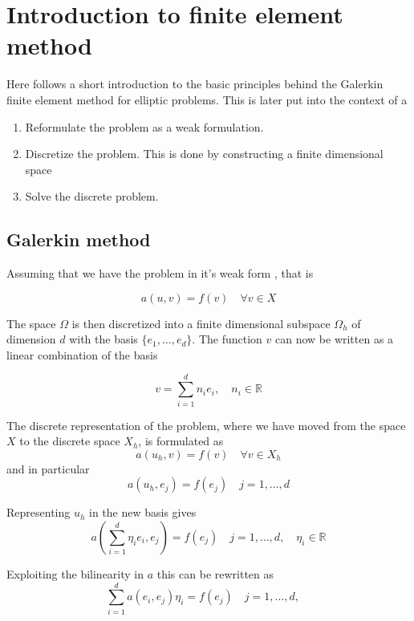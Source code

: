 \documentclass[fem.tex]{subfiles}
\begin{document}
\chapter{Introduction to finite element method}

Here follows a short introduction to the basic principles behind the Galerkin finite element method for elliptic problems. This is later put into the context of a 

\begin{enumerate}
\item Reformulate the problem as a weak formulation.
\item Discretize the problem. This is done by constructing a finite dimensional space 
\item Solve the discrete problem.

\end{enumerate}

\section{Galerkin method}
\label{sec:galerkin}
Assuming that we have the problem in it's weak form , that is 

\[  a(u,v) = f(v) \quad \forall v \in X \]

The space $\Omega$ is then discretized into a finite dimensional subspace $\Omega_h$ of dimension $d$ with the basis $\{e_1, \ldots, e_d\}$. The function $v$ can now be written as a linear combination of the basis

\[ v = \sum_{i=1}^d n_i e_i, \quad n_i \in \mathbb{R} \]

The discrete representation of the problem, where we have moved from the space $X$ to the discrete space $X_h$, is formulated as
%
\begin{equation} 
    a(u_h, v) = f(v) \quad \forall v \in X_h
    \label{eqn:disc_prob}
\end{equation}
%
and in particular
\begin{equation} 
    a(u_h, e_j) = f(e_j) \quad j = 1, \ldots, d
    \label{eqn:disc_part}
\end{equation}

Representing $u_h$ in the new basis gives
\begin{equation} 
    a \left(\sum_{i=1}^d \eta_i e_i, e_j\right) = f(e_j) \quad j = 1, \ldots, d, \quad \eta_i \in \mathbb{R}
    \label{eqn:u_new_base}
\end{equation}

Exploiting the bilinearity in $a$ this can be rewritten as 
\begin{equation} 
    \sum_{i=1}^d a \left( e_i, e_j\right)\eta_i = f(e_j) \quad j = 1, \ldots, d, \quad 
    \label{eqn:final}
\end{equation}
\end{document}
